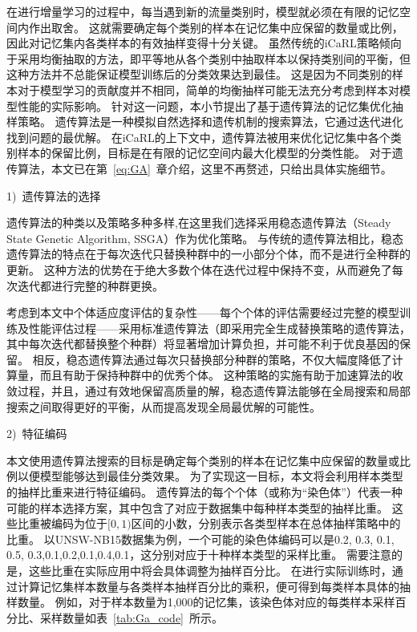 在进行增量学习的过程中，每当遇到新的流量类别时，模型就必须在有限的记忆空间内作出取舍。
这就需要确定每个类别的样本在记忆集中应保留的数量或比例，因此对记忆集内各类样本的有效抽样变得十分关键。
虽然传统的iCaRL策略倾向于采用均衡抽取的方法，即平等地从各个类别中抽取样本以保持类别间的平衡，但这种方法并不总能保证模型训练后的分类效果达到最佳。
这是因为不同类别的样本对于模型学习的贡献度并不相同，简单的均衡抽样可能无法充分考虑到样本对模型性能的实际影响。
针对这一问题，本小节提出了基于遗传算法的记忆集优化抽样策略。
遗传算法是一种模拟自然选择和遗传机制的搜索算法，它通过迭代进化找到问题的最优解。
在iCaRL的上下文中，遗传算法被用来优化记忆集中各个类别样本的保留比例，目标是在有限的记忆空间内最大化模型的分类性能。
对于遗传算法，本文已在第~\ref{eq:GA}~章介绍，这里不再赘述，只给出具体实施细节。\par

1)~遗传算法的选择\par
遗传算法的种类以及策略多种多样,在这里我们选择采用稳态遗传算法（Steady State Genetic Algorithm, SSGA）作为优化策略。
与传统的遗传算法相比，稳态遗传算法的特点在于每次迭代只替换种群中的一小部分个体，而不是进行全种群的更新。
这种方法的优势在于绝大多数个体在迭代过程中保持不变，从而避免了每次迭代都进行完整的种群更换。\par

考虑到本文中个体适应度评估的复杂性——每个个体的评估需要经过完整的模型训练及性能评估过程——采用标准遗传算法（即采用完全生成替换策略的遗传算法，其中每次迭代都替换整个种群）将显著增加计算负担，并可能不利于优良基因的保留。
相反，稳态遗传算法通过每次只替换部分种群的策略，不仅大幅度降低了计算量，而且有助于保持种群中的优秀个体。
这种策略的实施有助于加速算法的收敛过程，并且，通过有效地保留高质量的解，稳态遗传算法能够在全局搜索和局部搜索之间取得更好的平衡，从而提高发现全局最优解的可能性。\par

2)~特征编码\par
本文使用遗传算法搜索的目标是确定每个类别的样本在记忆集中应保留的数量或比例以便模型能够达到最佳分类效果。
为了实现这一目标，本文将会利用样本类型的抽样比重来进行特征编码。
遗传算法的每个个体（或称为“染色体”）代表一种可能的样本选择方案，其中包含了对应于数据集中每种样本类型的抽样比重。
这些比重被编码为位于$[0,1)$区间的小数，分别表示各类型样本在总体抽样策略中的比重。
以UNSW-NB15数据集为例，一个可能的染色体编码可以是{0.2, 0.3, 0.1, 0.5, 0.3,0.1,0.2,0.1,0.4,0.1}，这分别对应于十种样本类型的采样比重。
需要注意的是，这些比重在实际应用中将会具体调整为抽样百分比。
在进行实际训练时，通过计算记忆集样本数量与各类样本抽样百分比的乘积，便可得到每类样本具体的抽样数量。
例如，对于样本数量为1,000的记忆集，该染色体对应的每类样本采样百分比、采样数量如表~\ref{tab:Ga_code}~所示。\par

